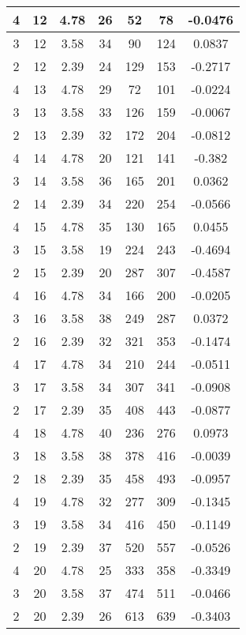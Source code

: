 \documentclass[letterpaper, 12pt]{article}
\begin{document}
\begin{longtable}{|c|c|c|c|c|c|c|}
\hline
4 & 12 & 4.78 & 26 & 52 & 78 & -0.0476 \\
\hline
3 & 12 & 3.58 & 34 & 90 & 124 & 0.0837 \\
\hline
2 & 12 & 2.39 & 24 & 129 & 153 & -0.2717 \\
\hline
4 & 13 & 4.78 & 29 & 72 & 101 & -0.0224 \\
\hline
3 & 13 & 3.58 & 33 & 126 & 159 & -0.0067 \\
\hline
2 & 13 & 2.39 & 32 & 172 & 204 & -0.0812 \\
\hline
4 & 14 & 4.78 & 20 & 121 & 141 & -0.382 \\
\hline
3 & 14 & 3.58 & 36 & 165 & 201 & 0.0362 \\
\hline
2 & 14 & 2.39 & 34 & 220 & 254 & -0.0566 \\
\hline
4 & 15 & 4.78 & 35 & 130 & 165 & 0.0455 \\
\hline
3 & 15 & 3.58 & 19 & 224 & 243 & -0.4694 \\
\hline
2 & 15 & 2.39 & 20 & 287 & 307 & -0.4587 \\
\hline
4 & 16 & 4.78 & 34 & 166 & 200 & -0.0205 \\
\hline
3 & 16 & 3.58 & 38 & 249 & 287 & 0.0372 \\
\hline
2 & 16 & 2.39 & 32 & 321 & 353 & -0.1474 \\
\hline
4 & 17 & 4.78 & 34 & 210 & 244 & -0.0511 \\
\hline
3 & 17 & 3.58 & 34 & 307 & 341 & -0.0908 \\
\hline
2 & 17 & 2.39 & 35 & 408 & 443 & -0.0877 \\
\hline
4 & 18 & 4.78 & 40 & 236 & 276 & 0.0973 \\
\hline
3 & 18 & 3.58 & 38 & 378 & 416 & -0.0039 \\
\hline
2 & 18 & 2.39 & 35 & 458 & 493 & -0.0957 \\
\hline
4 & 19 & 4.78 & 32 & 277 & 309 & -0.1345 \\
\hline
3 & 19 & 3.58 & 34 & 416 & 450 & -0.1149 \\
\hline
2 & 19 & 2.39 & 37 & 520 & 557 & -0.0526 \\
\hline
4 & 20 & 4.78 & 25 & 333 & 358 & -0.3349 \\
\hline
3 & 20 & 3.58 & 37 & 474 & 511 & -0.0466 \\
\hline
2 & 20 & 2.39 & 26 & 613 & 639 & -0.3403 \\
\hline
\end{longtable}
\end{document}
